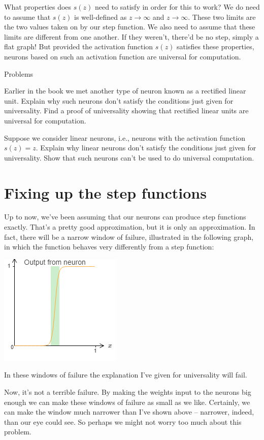 \documentclass[a4paper,twoside,10pt]{book}
\begin{document}
What properties does $s(z)$ need to satisfy in order for this to work? We do need to assume that $s(z)$ is well-defined as $z\to\infty$ and $z\to\infty$. These two limits are the two values taken on by our step function. We also need to assume that these limits are different from one another. If they weren't, there'd be no step, simply a flat graph! But provided the activation function $s(z)$ satisfies these properties, neurons based on such an activation function are universal for computation.

\begin{exercize}{Problems}
\item Earlier in the book we met another type of neuron known as a rectified linear unit. Explain why such neurons don't satisfy the conditions just given for universality. Find a proof of universality showing that rectified linear units are universal for computation.
\item Suppose we consider linear neurons, i.e., neurons with the activation function $s(z)=z$. Explain why linear neurons don't satisfy the conditions just given for universality. Show that such neurons can't be used to do universal computation.
\end{exercize}
\section{Fixing up the step functions}
Up to now, we've been assuming that our neurons can produce step functions exactly. That's a pretty good approximation, but it is only an approximation. In fact, there will be a narrow window of failure, illustrated in the following graph, in which the function behaves very differently from a step function:
\begin{center}
	\includegraphics[width=0.4\linewidth]{figures/ch4/tikz453}
\end{center}
In these windows of failure the explanation I've given for universality will fail.

Now, it's not a terrible failure. By making the weights input to the neurons big enough we can make these windows of failure as small as we like. Certainly, we can make the window much narrower than I've shown above -- narrower, indeed, than our eye could see. So perhaps we might not worry too much about this problem.
\end{document}
